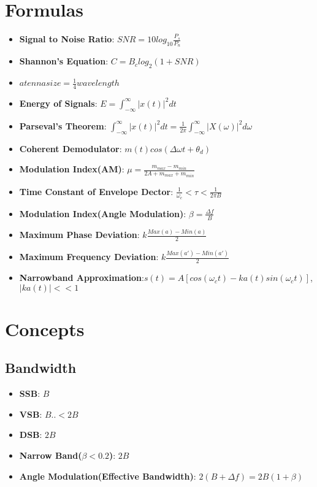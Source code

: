 \documentclass{article}
\begin{document}
\Large
     \section{Formulas}
     \begin{itemize}
        \item \textbf{Signal to Noise Ratio}: $SNR = 10log_{10}\frac{P_s}{P_n}$
        \item \textbf{Shannon's Equation}: $C = B_clog_2(1+SNR)$
        \item $atenna size = \frac{1}{4}wavelength$
        \item \textbf{Energy of Signals}: $E = \int_{-\infty} ^{\infty} |x(t)|^2dt$
        \item \textbf{Parseval's Theorem}:  $\int_{-\infty} ^{\infty} |x(t)|^2dt = \frac{1}{2\pi}\int_{-\infty}^{\infty}|X(\omega)|^2d\omega$
        \item \textbf{Coherent Demodulator}: $m(t)cos(\Delta \omega t + \theta_d)$
        \item \textbf{Modulation Index(AM)}: $\mu = \frac{m_{max} - m_{min}}{2A + m_{max} + m_{min}}$
        \item \textbf{Time Constant of Envelope Dector}: $\frac{1}{\omega_c}<\tau<\frac{1}{2\pi B}$
        
        \item \textbf{Modulation Index(Angle Modulation)}: $\beta = \frac{\Delta f}{B}$
        \item \textbf{Maximum Phase Deviation}: $k\frac{Max(a) - Min(a)}{2}$
        \item \textbf{Maximum Frequency Deviation}: $k\frac{Max(a')- Min(a')}{2}$
        \item \textbf{Narrowband Approximation}:$s(t) = A[cos(\omega_ct) - ka(t)sin(\omega_ct)]$, $|ka(t)|<<1$
        
     \end{itemize}
     
     
     \section{Concepts}
     \subsection{Bandwidth}
        \begin{itemize}
          \item \textbf{SSB}: $B$
          \item \textbf{VSB}: $B..<2B$
          \item \textbf{DSB}: $2B$
          \item \textbf{Narrow Band($\beta < 0.2$)}: $2B$
          \item\textbf{Angle Modulation(Effective Bandwidth)}: $2(B + \Delta f) = 2B(1+\beta)$
        \end{itemize}
\end{document}
